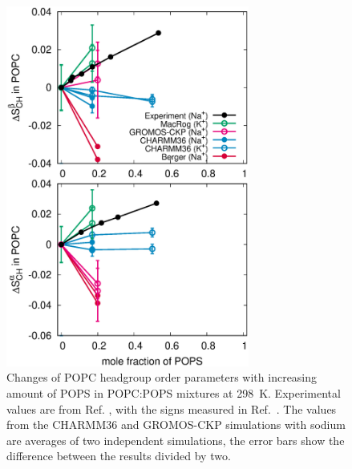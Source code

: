 \documentclass[journal=jpcbfk,manuscript=article]{achemso}
\begin{document}
\begin{figure}[!tb]
  \centering
  \includegraphics[width=8.0cm]{../Figs/HGorderparametersPCvsPS.eps}
  \caption{\label{HGorderparametersPCvsPS}
    Changes of POPC headgroup order parameters with increasing amount of POPS in POPC:POPS mixtures at 298~K.
    Experimental values are from Ref. , with the signs measured in Ref.~.
    The values from the CHARMM36 and GROMOS-CKP simulations with sodium are averages of two independent simulations,
    the error bars show the difference between the results divided by two.
  }\end{figure}
\end{document}
